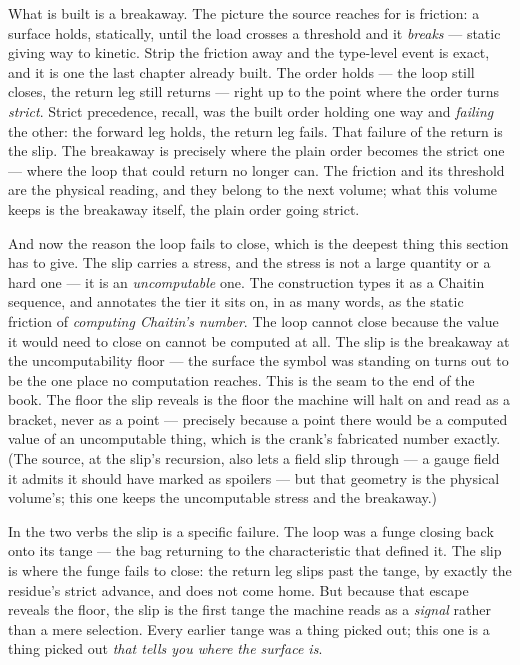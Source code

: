 What is built is a breakaway. The picture the source reaches for is friction: a surface holds, statically, until the
load crosses a threshold and it \emph{breaks} --- static giving way to kinetic. Strip the friction away and the
type-level event is exact, and it is one the last chapter already built. The order holds --- the loop still closes, the
return leg still returns --- right up to the point where the order turns \emph{strict}. Strict precedence, recall, was
the built order holding one way and \emph{failing} the other: the forward leg holds, the return leg fails. That failure
of the return is the slip. The breakaway is precisely where the plain order becomes the strict one --- where the loop
that could return no longer can. The friction and its threshold are the physical reading, and they belong to the next
volume; what this volume keeps is the breakaway itself, the plain order going strict.

And now the reason the loop fails to close, which is the deepest thing this section has to give. The slip carries a
stress, and the stress is not a large quantity or a hard one --- it is an \emph{uncomputable} one. The construction
types it as a Chaitin sequence, and annotates the tier it sits on, in as many words, as the static friction of
\emph{computing Chaitin's number}. The loop cannot close because the value it would need to close on cannot be computed
at all. The slip is the breakaway at the uncomputability floor --- the surface the symbol was standing on turns out to
be the one place no computation reaches. This is the seam to the end of the book. The floor the slip reveals is the
floor the machine will halt on and read as a bracket, never as a point --- precisely because a point there would be a
computed value of an uncomputable thing, which is the crank's fabricated number exactly. (The source, at the slip's
recursion, also lets a field slip through --- a gauge field it admits it should have marked as spoilers --- but that
geometry is the physical volume's; this one keeps the uncomputable stress and the breakaway.)

In the two verbs the slip is a specific failure. The loop was a funge closing back onto its tange --- the bag
returning to the characteristic that defined it. The slip is where the funge fails to close: the return leg slips past
the tange, by exactly the residue's strict advance, and does not come home. But because that escape reveals the floor,
the slip is the first tange the machine reads as a \emph{signal} rather than a mere selection. Every earlier tange was
a thing picked out; this one is a thing picked out \emph{that tells you where the surface is}.

